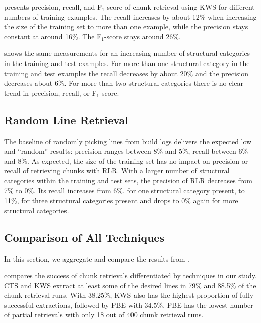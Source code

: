 presents precision,
recall, and F$_{1}$-score of chunk retrieval using KWS for different
numbers of training examples.
The recall increases by about 12\% when
increasing the size of the training set to more than one example,
while the precision stays constant at around 16\%.
The F$_{1}$-score
stays around 26\%.

 shows the same
measurements for an increasing number of structural categories in the
training and test examples.
For more than one structural category in
the training and test examples the recall decreases by about 20\% and
the precision decreases about 6\%.
For more than two structural
categories there is no clear trend in precision, recall, or
F$_{1}$-score.

\subsection{Random Line Retrieval}
\label{sec:r:rlr}

The baseline of randomly
picking lines from build logs delivers the expected low and
``random'' results: precision ranges between 8\% and 5\%,
recall between 6\% and 8\%.
As expected, the size of the training set has no impact on precision
or recall of retrieving chunks with RLR.
With a larger number of structural categories within the training and
test sets, the precision of RLR decreases from 7\% to 0\%.
Its recall
increases from 6\%, for one structural category present, to 11\%, for
three structural categories present and drops to 0\% again for more
structural categories.


\subsection{Comparison of All Techniques}
In this section, we aggregate and compare the results from
.

 compares the success of chunk
retrievals differentiated by techniques in our study.
CTS and KWS
extract at least some of the desired lines in 79\% and 88.5\%
of the chunk retrieval runs.
With 38.25\%, KWS also has the highest proportion of fully
successful extractions, followed by PBE with 34.5\%.
PBE has the
lowest number of partial retrievals with only 18 out of 400 chunk
retrieval runs.

